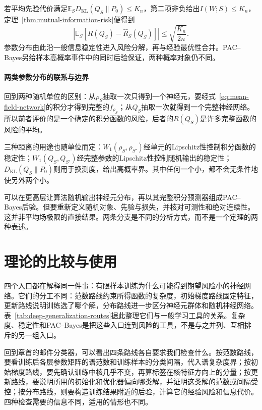若平均先验代价满足$\mathbb E_SD_{\mathrm{KL}}(Q_S\|P_0)\leq K_n$，第二项非负给出$I(W;S)\leq K_n$，定理~\ref{thm:mutual-information-risk}便得到
\[
 \left|\mathbb E_S[R(Q_S)-\hat R_S(Q_S)]\right|
 \leq\sqrt{\frac{K_n}{2n}}.
\]
参数分布由此沿一般信息稳定性进入风险分解，再与经验最优性合并。PAC--Bayes另给样本高概率事件中的同时后验保证，两种概率对象仍不同。

\paragraph{两类参数分布的联系与边界}

回到两种随机单位的区别：从$\rho_S$抽取一次只得到一个神经元，要经式~\eqref{eq:mean-field-network}的积分才得到完整的$f_{\rho_S}$；从$Q_S$抽取一次就得到一个完整神经网络。所以前者评价的是一个确定的积分函数的风险，后者的$R(Q_S)$是许多完整函数的风险的平均。

三种距离的用途也随单位而定：$W_1(\rho_S,\rho_{S'})$经单元的Lipschitz性控制积分函数的稳定性；$W_1(Q_S,Q_{S'})$经完整参数的Lipschitz性控制随机输出的稳定性；$D_{\mathrm{KL}}(Q_S\|P_0)$则用于换测度，给出高概率界。其中任何一个小，都不会无条件地使另外两个小。

可以在更高层让算法随机输出神经元分布，再以其完整积分预测器组成PAC--Bayes后验。但要重新定义随机对象、先验与损失，并核对可测性和绝对连续性。这并非平均场极限的直接结果。两条分支是不同的分析方式，而不是一个定理的两种表述。

\FloatBarrier
\section{理论的比较与使用}
\label{sec:deep-theory-comparison}

四个入口都在解释同一件事：有限样本训练为什么可能得到期望风险小的神经网络。它们的分工不同：范数路线约束所得函数的复杂度，初始梯度路线固定特征，更新路线说明训练选了哪个解，分布路线进一步区分神经元群体和随机神经网络。表~\ref{tab:deep-generalization-routes}据此整理它们与一般学习工具的关系。复杂度、稳定性和PAC--Bayes是把这些入口连到风险的工具，不是与之并列、互相排斥的另一组入口。

回到章首的邮件分类器，可以看出四条路线各自要求我们检查什么。按范数路线，要看训练后各层参数矩阵的谱范数和训练样本的分类间隔，代入谱复杂度界；按初始梯度路线，要先确认训练中核几乎不变，再算标签在核特征方向上的分量；按更新路线，要说明所用的初始化和优化器偏向哪类解，并证明这类解的范数或间隔受控；按分布路线，则要构造训练结果附近的后验，计算它的经验风险和信息代价。四种检查需要的信息不同，适用的情形也不同。

